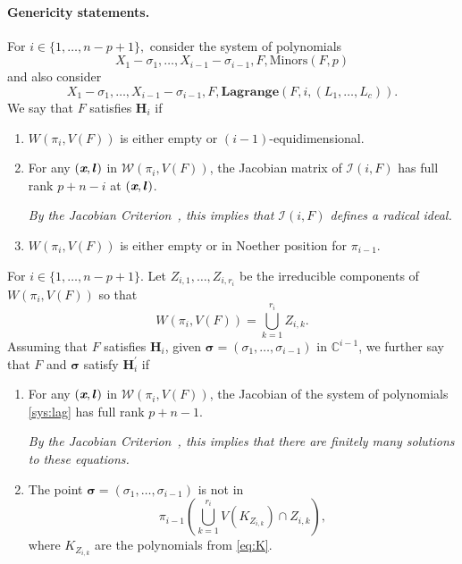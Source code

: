 \documentclass[a4paper]{article}
\def\lb{{\bm l}}
\def\xb{\textit{\textbf{x}}}
\def\minors{\textrm{Minors}(F,p)}
\def\C{\mathbb{C}}
\def\lagF{{\bm{Lagrange}}(F,i,(L_1,\hdots,L_c))}
\begin{document}
\paragraph*{Genericity statements.}
For $i \in \{1,\hdots,n-p+1\},$ consider the system of polynomials 
\begin{equation}\label{sys:minors}
    X_1-\sigma_1,\dots,X_{i-1}-\sigma_{i-1},F, \minors
\end{equation}
and also consider
\begin{equation}\label{sys:lag}
    X_1-\sigma_1,\dots,X_{i-1}-\sigma_{i-1},F, \lagF.
\end{equation}
We say that $F$ satisfies $\bm H_i$ if
%
%
\begin{enumerate}
\item  $W(\pi_i,V(F))$ is either empty or $(i-1)$-equidimensional.
\item For any $(\xb,\lb)$ in $\mathscr{W}(\pi_i,V(F))$, the Jacobian matrix of $\mathscr{I}(i,F)$ has full rank $p+n-i$ at $(\xb,\lb)$.  

{\em By the Jacobian Criterion~\cite[Corollary 16.20]{ECA}, this
  implies that $\mathscr{I}(i,F)$ defines a radical ideal.}
\item $W(\pi_i,V(F))$ is either empty or in Noether position for
  $\pi_{i-1}$.
\smallskip
\end{enumerate}
%
\noindent 
For $i \in \{1,\hdots,n-p+1\}.$ Let $Z_{i,1},\hdots,Z_{i,r_i}$ be the irreducible components of $W(\pi_i,V(F))$ so that
\[
W(\pi_i,V(F)) = \bigcup_{k=1}^{r_i} Z_{i,k}.
\] Assuming that $F$ satisfies $\bm H_i$, given $\bm \sigma = (\sigma_1,\hdots,\sigma_{i-1})$ 
in $\C^{i-1}$, we further say that $F$ and $\bm \sigma$ satisfy
$\bm H^{'}_i$ if
\begin{enumerate}
\item For any $(\xb,\lb)$ in $\mathscr{W}(\pi_i,V(F))$, the Jacobian of the system of polynomials \ref{sys:lag}
has full rank $p+n-1$. 

{\em By the Jacobian Criterion~\cite[Corollary 16.20]{ECA}, this implies that there are finitely many solutions to these equations.}

\item The point $\bm \sigma = (\sigma_1,\hdots,\sigma_{i-1})$ is not in 
\[\pi_{i-1} \left(\bigcup_{k=1}^{r_i} V(K_{Z_{i,k}}) \cap Z_{i,k}\right),\] 
where $K_{Z_{i,k}}$ are the polynomials from \eqref{eq:K}.

\end{enumerate}
\end{document}
